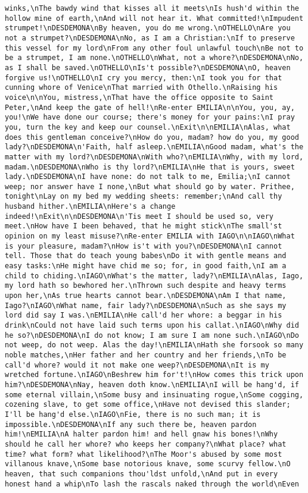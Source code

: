 \begin{verbatim}
winks,\nThe bawdy wind that kisses all it meets\nIs hush'd within the hollow mine of earth,\nAnd will not hear it. What committed!\nImpudent strumpet!\nDESDEMONA\nBy heaven, you do me wrong.\nOTHELLO\nAre you not a strumpet?\nDESDEMONA\nNo, as I am a Christian:\nIf to preserve this vessel for my lord\nFrom any other foul unlawful touch\nBe not to be a strumpet, I am none.\nOTHELLO\nWhat, not a whore?\nDESDEMONA\nNo, as I shall be saved.\nOTHELLO\nIs't possible?\nDESDEMONA\nO, heaven forgive us!\nOTHELLO\nI cry you mercy, then:\nI took you for that cunning whore of Venice\nThat married with Othello.\nRaising his voice\n\nYou, mistress,\nThat have the office opposite to Saint Peter,\nAnd keep the gate of hell!\nRe-enter EMILIA\n\nYou, you, ay, you!\nWe have done our course; there's money for your pains:\nI pray you, turn the key and keep our counsel.\nExit\n\nEMILIA\nAlas, what does this gentleman conceive?\nHow do you, madam? how do you, my good lady?\nDESDEMONA\n'Faith, half asleep.\nEMILIA\nGood madam, what's the matter with my lord?\nDESDEMONA\nWith who?\nEMILIA\nWhy, with my lord, madam.\nDESDEMONA\nWho is thy lord?\nEMILIA\nHe that is yours, sweet lady.\nDESDEMONA\nI have none: do not talk to me, Emilia;\nI cannot weep; nor answer have I none,\nBut what should go by water. Prithee, tonight\nLay on my bed my wedding sheets: remember;\nAnd call thy husband hither.\nEMILIA\nHere's a change indeed!\nExit\n\nDESDEMONA\n'Tis meet I should be used so, very meet.\nHow have I been behaved, that he might stick\nThe small'st opinion on my least misuse?\nRe-enter EMILIA with IAGO\n\nIAGO\nWhat is your pleasure, madam?\nHow is't with you?\nDESDEMONA\nI cannot tell. Those that do teach young babes\nDo it with gentle means and easy tasks:\nHe might have chid me so; for, in good faith,\nI am a child to chiding.\nIAGO\nWhat's the matter, lady?\nEMILIA\nAlas, Iago, my lord hath so bewhored her.\nThrown such despite and heavy terms upon her,\nAs true hearts cannot bear.\nDESDEMONA\nAm I that name, Iago?\nIAGO\nWhat name, fair lady?\nDESDEMONA\nSuch as she says my lord did say I was.\nEMILIA\nHe call'd her whore: a beggar in his drink\nCould not have laid such terms upon his callat.\nIAGO\nWhy did he so?\nDESDEMONA\nI do not know; I am sure I am none such.\nIAGO\nDo not weep, do not weep. Alas the day!\nEMILIA\nHath she forsook so many noble matches,\nHer father and her country and her friends,\nTo be call'd whore? would it not make one weep?\nDESDEMONA\nIt is my wretched fortune.\nIAGO\nBeshrew him for't!\nHow comes this trick upon him?\nDESDEMONA\nNay, heaven doth know.\nEMILIA\nI will be hang'd, if some eternal villain,\nSome busy and insinuating rogue,\nSome cogging, cozening slave, to get some office,\nHave not devised this slander; I'll be hang'd else.\nIAGO\nFie, there is no such man; it is impossible.\nDESDEMONA\nIf any such there be, heaven pardon him!\nEMILIA\nA halter pardon him! and hell gnaw his bones!\nWhy should he call her whore? who keeps her company?\nWhat place? what time? what form? what likelihood?\nThe Moor's abused by some most villanous knave,\nSome base notorious knave, some scurvy fellow.\nO heaven, that such companions thou'ldst unfold,\nAnd put in every honest hand a whip\nTo lash the rascals naked through the world\nEven 
\end{verbatim}

